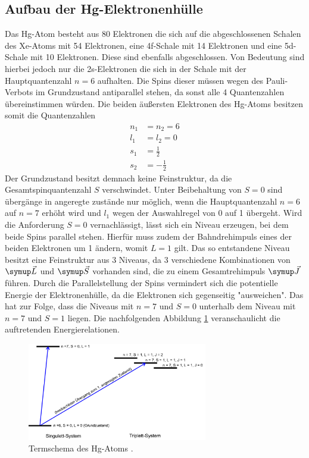 \subsection{Aufbau der Hg-Elektronenhülle}
Das Hg-Atom besteht aus 80 Elektronen die sich auf die abgeschlossenen Schalen
des Xe-Atoms mit 54 Elektronen, eine 4f-Schale mit 14 Elektronen und eine
5d-Schale mit 10 Elektronen. Diese sind ebenfalls abgeschlossen. Von Bedeutung
sind hierbei jedoch nur die 2s-Elektronen die sich in der Schale mit der
Hauptquantenzahl $n=6$ aufhalten. Die Spins dieser müssen wegen des
Pauli-Verbots im Grundzustand antiparallel stehen, da sonst alle 4
Quantenzahlen übereinstimmen würden.
Die beiden äußersten Elektronen des Hg-Atoms besitzen somit die
Quantenzahlen
\begin{align*}
  n_1 &= n_2 = 6 \\
  l_1 &= l_2 = 0 \\
  s_1 &= \frac{1}{2} \\
  s_2 &= - \frac{1}{2}
\end{align*}
Der Grundzustand besitzt demnach keine Feinstruktur, da die Gesamtspinquantenzahl
$S$ verschwindet. Unter Beibehaltung von $S=0$ sind übergänge in angeregte
zustände nur möglich, wenn die Hauptquantenzahl $n=6$ auf $n=7$ erhöht wird
und $l_1$ wegen der Auswahlregel von 0 auf 1 übergeht. Wird die Anforderung
$S=0$ vernachlässigt, lässt sich ein Niveau erzeugen, bei dem beide Spins
parallel stehen. Hierfür muss zudem der Bahndrehimpuls eines der beiden
Elektronen um 1 ändern, womit $L=1$ gilt. Das so entstandene Niveau besitzt
eine Feinstruktur aus 3 Niveaus, da 3 verschiedene Kombinationen von
$\su{\vec{L}}$ und $\su{\vec{S}}$ vorhanden sind, die zu einem Gesamtrehimpuls
$\su{\vec{J}}$ führen. Durch die Parallelstellung der Spins vermindert sich
die potentielle Energie der Elektronenhülle, da die Elektronen sich gegenseitig
"ausweichen". Das hat zur Folge, dass die Niveaus mit $n=7$ und $S=0$ unterhalb
dem Niveau mit $n=7$ und $S=1$ liegen. Die nachfolgenden Abbildung \ref{fig:termschema}
veranschaulicht die auftretenden Energierelationen.
\begin{figure}
  \centering
  \includegraphics[width=0.7\textwidth]{bilder/term.jpg}
  \caption{Termschema des Hg-Atoms \cite{601}.}
  \label{fig:termschema}
\end{figure}
